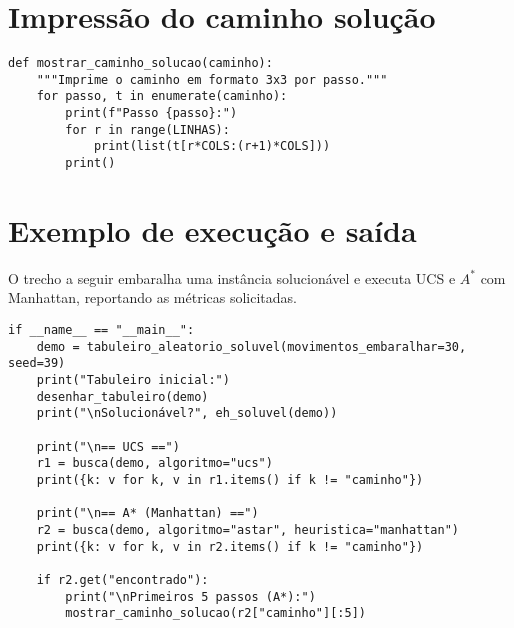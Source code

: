 
\section{Impressão do caminho solução}

\begin{verbatim}
def mostrar_caminho_solucao(caminho):
    """Imprime o caminho em formato 3x3 por passo."""
    for passo, t in enumerate(caminho):
        print(f"Passo {passo}:")
        for r in range(LINHAS):
            print(list(t[r*COLS:(r+1)*COLS]))
        print()
\end{verbatim}


\section{Exemplo de execução e saída}

O trecho a seguir embaralha uma instância solucionável e executa UCS e $A^*$ com Manhattan, reportando as métricas solicitadas.

\begin{verbatim}
if __name__ == "__main__":
    demo = tabuleiro_aleatorio_soluvel(movimentos_embaralhar=30, seed=39)
    print("Tabuleiro inicial:")
    desenhar_tabuleiro(demo)
    print("\nSolucionável?", eh_soluvel(demo))

    print("\n== UCS ==")
    r1 = busca(demo, algoritmo="ucs")
    print({k: v for k, v in r1.items() if k != "caminho"})

    print("\n== A* (Manhattan) ==")
    r2 = busca(demo, algoritmo="astar", heuristica="manhattan")
    print({k: v for k, v in r2.items() if k != "caminho"})

    if r2.get("encontrado"):
        print("\nPrimeiros 5 passos (A*):")
        mostrar_caminho_solucao(r2["caminho"][:5])
\end{verbatim}
